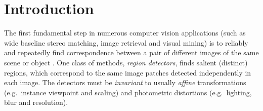 \documentclass[conference,compsoc]{IEEEtran}
\begin{document}




%
\IEEEpeerreviewmaketitle


\section{Introduction}
\label{sec:intro}
The first fundamental step in numerous computer vision applications (such as wide baseline stereo matching, image retrieval and visual mining) is to reliably and repeatedly find correspondence between a pair of different images of the same scene or object \cite{Matas2002BMVC, Rodriguez2013, EscaleraCVPR07}. One class of methods, {\em region detectors}, finds salient (distinct) regions, which correspond to the same image patches detected independently in each image. The detectors must be {\em invariant} to usually {\em affine} transformations (e.g.~instance viewpoint and scaling) and photometric distortions (e.g.~lighting, blur and resolution). 
\end{document}
